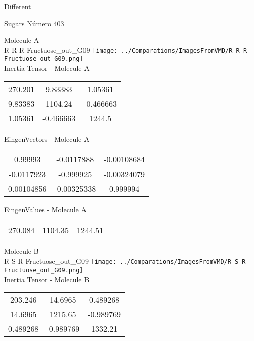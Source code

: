 \begin{center}
\vtab
\vtab
\textcolor{NavyBlue}{\Large Different}
\end{center}

 \newpage

\vtab[-2cm]
\begin{center}
{\large Sugars \tab Número 403}
\end{center}
\begin{multicols}{2}
\begin{center}

Molecule A \\ 
R-R-R-Fructuose\_out\_G09
\texttt{[image: ../Comparations/ImagesFromVMD/R-R-R-Fructuose\_out\_G09.png]}
\\
Inertia Tensor - Molecule A \\
\vtab

\begin{tabular}{|c c c|}
270.201	 & 	9.83383	 & 	1.05361	 \\
9.83383	 & 	1104.24	 & 	-0.466663	 \\
1.05361	 & 	-0.466663	 & 	1244.5
\end{tabular}

\vtab
 EingenVectors - Molecule A     \\
\vtab
\begin{tabular}{|c c c|}
0.99993	 & 	-0.0117888	 & 	-0.00108684	 \\
-0.0117923	 & 	-0.999925	 & 	-0.00324079	 \\
0.00104856	 & 	-0.00325338	 & 	0.999994
\end{tabular}

\vtab
 EingenValues - Molecule A     \\
\vtab
\begin{tabular}{|c c c|}
270.084	 & 	1104.35	 & 	1244.51	 \\
\end{tabular}
\columnbreak

Molecule B \\ 
R-S-R-Fructuose\_out\_G09
\texttt{[image: ../Comparations/ImagesFromVMD/R-S-R-Fructuose\_out\_G09.png]}
\\
Inertia Tensor - Molecule B \\
\vtab

\begin{tabular}{|c c c|}
203.246	 & 	14.6965	 & 	0.489268	 \\
14.6965	 & 	1215.65	 & 	-0.989769	 \\
0.489268	 & 	-0.989769	 & 	1332.21
\end{tabular}


\end{center}
\end{multicols}

